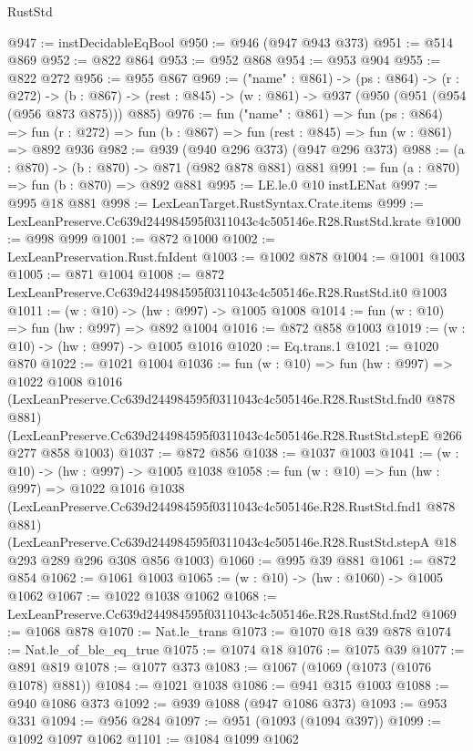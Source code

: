 \begin{lexlean}{RustStd}
\begin{coremodule}
@947 := instDecidableEqBool
@950 := @946 (@947 @943 @373)
@951 := @514 @869
@952 := @822 @864
@953 := @952 @868
@954 := @953 @904
@955 := @822 @272
@956 := @955 @867
@969 := ("name" : @861) ->
  (ps : @864) ->
  (r : @272) ->
  (b : @867) -> (rest : @845) -> (w : @861) -> @937 (@950 (@951 (@954 (@956 @873 @875))) @885)
@976 := fun ("name" : @861) =>
  fun (ps : @864) =>
  fun (r : @272) => fun (b : @867) => fun (rest : @845) => fun (w : @861) => @892 @936
@982 := @939 (@940 @296 @373) (@947 @296 @373)
@988 := (a : @870) -> (b : @870) -> @871 (@982 @878 @881) @881
@991 := fun (a : @870) => fun (b : @870) => @892 @881
@995 := LE.le.{0} @10 instLENat
@997 := @995 @18 @881
@998 := LexLeanTarget.RustSyntax.Crate.items
@999 := LexLeanPreserve.Cc639d244984595f0311043c4c505146e.R28.RustStd.krate
@1000 := @998 @999
@1001 := @872 @1000
@1002 := LexLeanPreservation.Rust.fnIdent
@1003 := @1002 @878
@1004 := @1001 @1003
@1005 := @871 @1004
@1008 := @872 LexLeanPreserve.Cc639d244984595f0311043c4c505146e.R28.RustStd.it0 @1003
@1011 := (w : @10) -> (hw : @997) -> @1005 @1008
@1014 := fun (w : @10) => fun (hw : @997) => @892 @1004
@1016 := @872 @858 @1003
@1019 := (w : @10) -> (hw : @997) -> @1005 @1016
@1020 := Eq.trans.{1}
@1021 := @1020 @870
@1022 := @1021 @1004
@1036 := fun (w : @10) =>
  fun (hw : @997) =>
  @1022
    @1008
    @1016
    (LexLeanPreserve.Cc639d244984595f0311043c4c505146e.R28.RustStd.fnd0 @878 @881)
    (LexLeanPreserve.Cc639d244984595f0311043c4c505146e.R28.RustStd.stepE @266 @277 @858 @1003)
@1037 := @872 @856
@1038 := @1037 @1003
@1041 := (w : @10) -> (hw : @997) -> @1005 @1038
@1058 := fun (w : @10) =>
  fun (hw : @997) =>
  @1022
    @1016
    @1038
    (LexLeanPreserve.Cc639d244984595f0311043c4c505146e.R28.RustStd.fnd1 @878 @881)
    (LexLeanPreserve.Cc639d244984595f0311043c4c505146e.R28.RustStd.stepA
      @18
      @293
      @289
      @296
      @308
      @856
      @1003)
@1060 := @995 @39 @881
@1061 := @872 @854
@1062 := @1061 @1003
@1065 := (w : @10) -> (hw : @1060) -> @1005 @1062
@1067 := @1022 @1038 @1062
@1068 := LexLeanPreserve.Cc639d244984595f0311043c4c505146e.R28.RustStd.fnd2
@1069 := @1068 @878
@1070 := Nat.le_trans
@1073 := @1070 @18 @39 @878
@1074 := Nat.le_of_ble_eq_true
@1075 := @1074 @18
@1076 := @1075 @39
@1077 := @891 @819
@1078 := @1077 @373
@1083 := @1067 (@1069 (@1073 (@1076 @1078) @881))
@1084 := @1021 @1038
@1086 := @941 @315 @1003
@1088 := @940 @1086 @373
@1092 := @939 @1088 (@947 @1086 @373)
@1093 := @953 @331
@1094 := @956 @284
@1097 := @951 (@1093 (@1094 @397))
@1099 := @1092 @1097 @1062
@1101 := @1084 @1099 @1062

\end{coremodule}
\end{lexlean}
